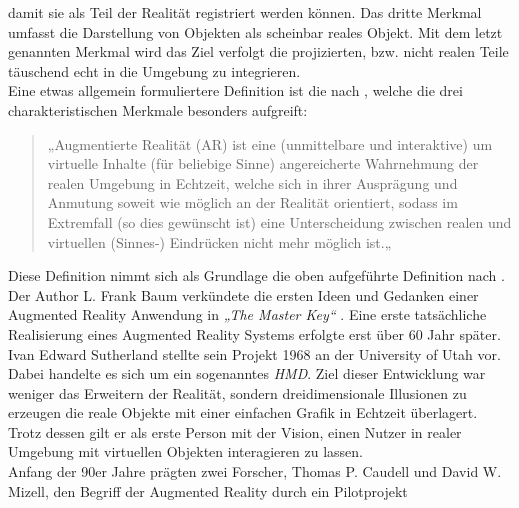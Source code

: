 damit sie als Teil der Realität registriert werden können. Das dritte Merkmal umfasst die Darstellung von Objekten als scheinbar reales 
Objekt. Mit dem letzt genannten Merkmal wird das Ziel verfolgt die projizierten, bzw. nicht realen Teile täuschend echt in die Umgebung zu 
integrieren.
\\ 
\linebreak  
Eine etwas allgemein formuliertere Definition ist die nach \cite{springer.2019s}, welche die drei charakteristischen Merkmale besonders 
aufgreift:
\begin{quote}
    „Augmentierte Realität (AR) ist eine (unmittelbare und interaktive) um virtuelle Inhalte (für beliebige Sinne) angereicherte Wahrnehmung der 
    realen Umgebung in Echtzeit, welche sich in ihrer Ausprägung und Anmutung soweit wie möglich an der Realität orientiert, sodass im 
    Extremfall (so dies gewünscht ist) eine Unterscheidung zwischen realen und virtuellen (Sinnes-) Eindrücken nicht mehr möglich ist.„ \cite{springer.2019s}
\end{quote}
Diese Definition nimmt sich als Grundlage die oben aufgeführte Definition nach \cite{azuma.1997a}.
\\ 
\linebreak
Der Author L. Frank Baum \cite{frankbaum.1856m} verkündete die ersten Ideen und Gedanken einer Augmented Reality Anwendung in 
\textit{„The Master Key“} \cite{masterkey.1996f}. Eine erste tatsächliche Realisierung eines Augmented Reality Systems erfolgte erst über 
60 Jahr später. Ivan Edward Sutherland \cite{sutherlandbio.1938m} stellte sein Projekt 1968 an der University of Utah vor. Dabei handelte es 
sich um ein sogenanntes \textit{\ac{HMD}}. Ziel dieser Entwicklung war weniger das Erweitern der Realität, sondern dreidimensionale 
Illusionen zu erzeugen die reale Objekte mit einer einfachen Grafik in Echtzeit überlagert. %
Trotz dessen gilt er als erste Person mit der Vision, einen Nutzer in realer Umgebung mit virtuellen Objekten interagieren zu lassen.
\\ 
Anfang der 90er Jahre prägten zwei Forscher, Thomas P. Caudell und David W. Mizell, den Begriff der Augmented Reality durch ein Pilotprojekt
